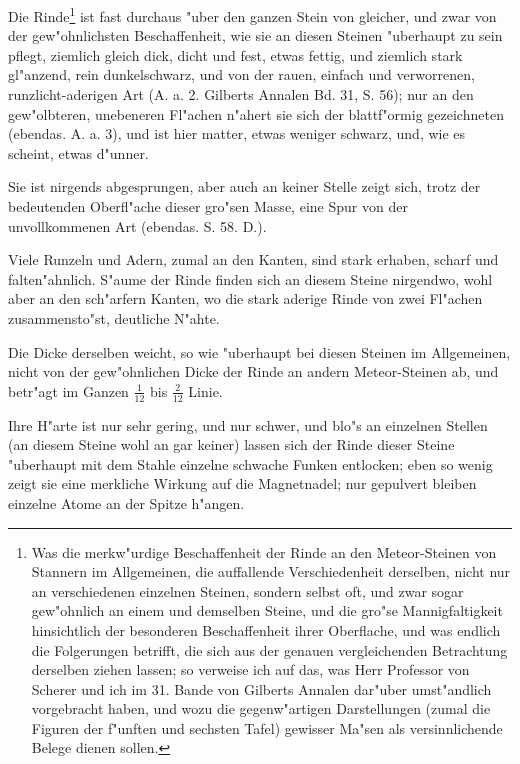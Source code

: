 \documentclass[a4paper, 11pt, oneside, german]{article}
\begin{document}
Die Rinde\footnote{Was die merkw"urdige Beschaffenheit der Rinde an den Meteor-Steinen von Stannern im Allgemeinen, die auffallende Verschiedenheit derselben, nicht nur an verschiedenen einzelnen Steinen, sondern selbst oft, und zwar sogar gew"ohnlich an einem und demselben Steine, und die gro"se Mannigfaltigkeit hinsichtlich der besonderen Beschaffenheit ihrer Oberflache, und was endlich die Folgerungen betrifft, die sich aus der genauen vergleichenden Betrachtung derselben ziehen lassen; so verweise ich auf das, was Herr Professor von Scherer und ich im 31. Bande von Gilberts Annalen dar"uber umst"andlich vorgebracht haben, und wozu die gegenw"artigen Darstellungen (zumal die Figuren der f"unften und sechsten Tafel) gewisser Ma"sen als versinnlichende Belege dienen sollen.} ist fast durchaus "uber den ganzen Stein von gleicher, und zwar von der gew"ohnlichsten Beschaffenheit, wie sie an diesen Steinen "uberhaupt zu sein pflegt, ziemlich gleich dick, dicht und fest, etwas fettig, und ziemlich stark gl"anzend, rein dunkelschwarz, und von der rauen, einfach und verworrenen, runzlicht-aderigen Art (A. a. 2. Gilberts Annalen Bd. 31, S. 56); nur an den gew"olbteren, unebeneren Fl"achen n"ahert sie sich der blattf"ormig gezeichneten (ebendas. A. a. 3), und ist hier matter, etwas weniger schwarz, und, wie es scheint, etwas d"unner.

Sie ist nirgends abgesprungen, aber auch an keiner Stelle zeigt sich, trotz der bedeutenden Oberfl"ache dieser gro"sen Masse, eine Spur von der unvollkommenen Art (ebendas. S. 58. D.).

Viele Runzeln und Adern, zumal an den Kanten, sind stark erhaben, scharf und falten"ahnlich. S"aume der Rinde finden sich an diesem Steine nirgendwo, wohl aber an den sch"arfern Kanten, wo die stark aderige Rinde von zwei Fl"achen zusammensto"st, deutliche N"ahte.

Die Dicke derselben weicht, so wie "uberhaupt bei diesen Steinen im Allgemeinen, nicht von der gew"ohnlichen Dicke der Rinde an andern Meteor-Steinen ab, und betr"agt im Ganzen $\frac{1}{12}$ bis $\frac{2}{12}$ Linie.

Ihre H"arte ist nur sehr gering, und nur schwer, und blo"s an einzelnen Stellen (an diesem Steine wohl an gar keiner) lassen sich der Rinde dieser Steine "uberhaupt mit dem Stahle einzelne schwache Funken entlocken; eben so wenig zeigt sie eine merkliche Wirkung auf die Magnetnadel; nur gepulvert bleiben einzelne Atome an der Spitze h"angen.
\end{document}

